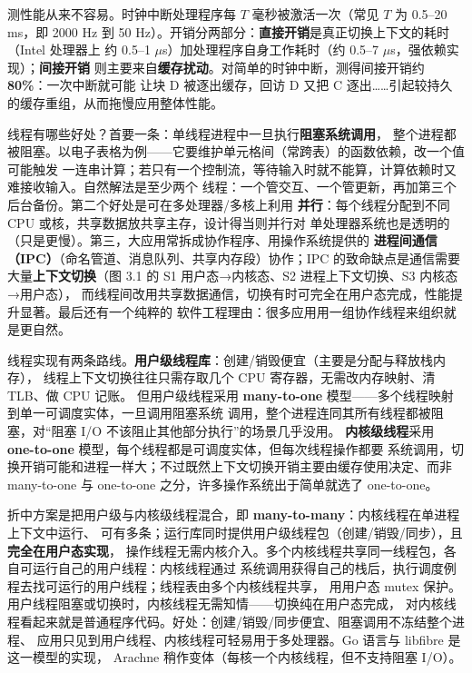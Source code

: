 \begin{ideabox}
测性能从来不容易。时钟中断处理程序每 $T$ 毫秒被激活一次（常见 $T$ 为 0.5–20 ms，即
2000 Hz 到 50 Hz）。开销分两部分：\textbf{直接开销}是真正切换上下文的耗时（Intel 处理器上
约 0.5–1 $\mu$s）加处理程序自身工作耗时（约 0.5–7 $\mu$s，强依赖实现）；\textbf{间接开销}
则主要来自\textbf{缓存扰动}。对简单的时钟中断，测得间接开销约 \textbf{80\%}：一次中断就可能
让块 D 被逐出缓存，回访 D 又把 C 逐出……引起较持久的缓存重组，从而拖慢应用整体性能。
\end{ideabox}

\medskip\noindent 线程有哪些好处？首要一条：单线程进程中一旦执行\textbf{阻塞系统调用}，
整个进程都被阻塞。以电子表格为例——它要维护单元格间（常跨表）的函数依赖，改一个值可能触发
一连串计算；若只有一个控制流，等待输入时就不能算，计算依赖时又难接收输入。自然解法是至少两个
线程：一个管交互、一个管更新，再加第三个后台备份。第二个好处是可在多处理器/多核上利用
\textbf{并行}：每个线程分配到不同 CPU 或核，共享数据放共享主存，设计得当则并行对
单处理器系统也是透明的（只是更慢）。第三，大应用常拆成协作程序、用操作系统提供的
\textbf{进程间通信（IPC）}（命名管道、消息队列、共享内存段）协作；IPC 的致命缺点是通信需要
大量\textbf{上下文切换}（图 3.1 的 S1 用户态→内核态、S2 进程上下文切换、S3 内核态→用户态），
而线程间改用共享数据通信，切换有时可完全在用户态完成，性能提升显著。最后还有一个纯粹的
软件工程理由：很多应用用一组协作线程来组织就是更自然。

\medskip\noindent 线程实现有两条路线。\textbf{用户级线程库}：创建/销毁便宜（主要是分配与释放栈内存），
线程上下文切换往往只需存取几个 CPU 寄存器，无需改内存映射、清 TLB、做 CPU 记账。
但用户级线程采用 \textbf{many-to-one} 模型——多个线程映射到单一可调度实体，一旦调用阻塞系统
调用，整个进程连同其所有线程都被阻塞，对“阻塞 I/O 不该阻止其他部分执行”的场景几乎没用。
\textbf{内核级线程}采用 \textbf{one-to-one} 模型，每个线程都是可调度实体，但每次线程操作都要
系统调用，切换开销可能和进程一样大；不过既然上下文切换开销主要由缓存使用决定、而非
many-to-one 与 one-to-one 之分，许多操作系统出于简单就选了 one-to-one。

\begin{ideabox}
折中方案是把用户级与内核级线程混合，即 \textbf{many-to-many}：内核线程在单进程上下文中运行、
可有多条；运行库同时提供用户级线程包（创建/销毁/同步），且\textbf{完全在用户态实现}，
操作线程无需内核介入。多个内核线程共享同一线程包，各自可运行自己的用户线程：内核线程通过
系统调用获得自己的栈后，执行调度例程去找可运行的用户线程；线程表由多个内核线程共享，
用用户态 mutex 保护。用户线程阻塞或切换时，内核线程无需知情——切换纯在用户态完成，
对内核线程看起来就是普通程序代码。好处：创建/销毁/同步便宜、阻塞调用不冻结整个进程、
应用只见到用户线程、内核线程可轻易用于多处理器。Go 语言与 libfibre 是这一模型的实现，
Arachne 稍作变体（每核一个内核线程，但不支持阻塞 I/O）。
\end{ideabox}

